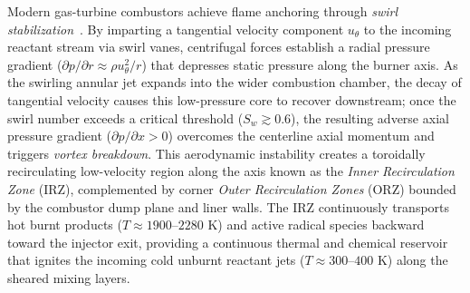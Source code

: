 Modern gas-turbine combustors achieve flame anchoring through \emph{swirl stabilization}~\cite{syred1974combustion, candel2014dynamics}. By imparting a tangential velocity component $u_\theta$ to the incoming reactant stream via swirl vanes, centrifugal forces establish a radial pressure gradient ($\partial p / \partial r \approx \rho u_\theta^2 / r$) that depresses static pressure along the burner axis. As the swirling annular jet expands into the wider combustion chamber, the decay of tangential velocity causes this low-pressure core to recover downstream; once the swirl number exceeds a critical threshold ($S_w \gtrsim 0.6$), the resulting adverse axial pressure gradient ($\partial p / \partial x > 0$) overcomes the centerline axial momentum and triggers \emph{vortex breakdown}. This aerodynamic instability creates a toroidally recirculating low-velocity region along the axis known as the \emph{Inner Recirculation Zone} (IRZ), complemented by corner \emph{Outer Recirculation Zones} (ORZ) bounded by the combustor dump plane and liner walls. The IRZ continuously transports hot burnt products ($T \approx 1900\text{--}2280\text{ K}$) and active radical species backward toward the injector exit, providing a continuous thermal and chemical reservoir that ignites the incoming cold unburnt reactant jets ($T \approx 300\text{--}400\text{ K}$) along the sheared mixing layers.

